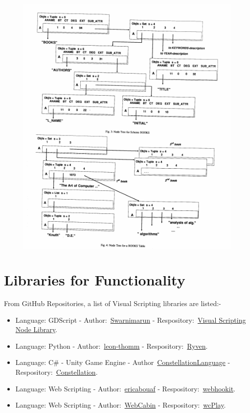 \documentclass[12pt]{report} %
\begin{document}
		\begin{figure}[H]
			{\includegraphics[scale=0.6]{Figures/VPDBEDIT.png}}
		\end{figure}

	\section{Libraries for Functionality}
		From GitHub Repositories, a list of Visual Scripting libraries are listed:-
		\begin{itemize}
		\item Language: GDScript - Author:~\href{https://github.com/swarnimarun}{Swarnimarun} - Respository:~\href{https://github.com/swarnimarun/visual-scripting-node-library}{Visual Scripting Node Library}.
		\item Language: Python - Author:~\href{https://github.com/leon-thomm}{leon-thomm} - Respository:~\href{https://github.com/leon-thomm/Ryven}{Ryven}.
		\item Language: C\# - Unity Game Engine - Author~\href{https://github.com/ConstellationLanguage}{ConstellationLanguage} - Respository:~\href{https://github.com/ConstellationLanguage/Constellation}{Constellation}.
		\item Language: Web Scripting - Author:~\href{https://github.com/ericabouaf}{ericabouaf} - Respository:~\href{https://github.com/ericabouaf/webhookit}{webhookit}.
		\item Language: Web Scripting - Author:~\href{https://github.com/WebCabin}{WebCabin} - Respository:~\href{https://github.com/WebCabin/wcPlay}{wcPlay}.
		\end{itemize}
\end{document}
